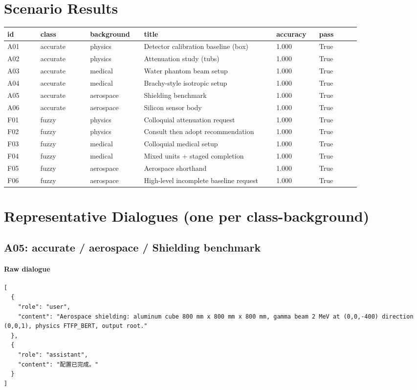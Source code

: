 \documentclass[11pt]{article}
\begin{document}
\section{Scenario Results}
\begin{longtable}{p{0.08\linewidth}p{0.12\linewidth}p{0.12\linewidth}p{0.32\linewidth}p{0.1\linewidth}p{0.1\linewidth}}
\toprule
id & class & background & title & accuracy & pass\\
\midrule
A01 & accurate & physics & Detector calibration baseline (box) & 1.000 & True \\
A02 & accurate & physics & Attenuation study (tubs) & 1.000 & True \\
A03 & accurate & medical & Water phantom beam setup & 1.000 & True \\
A04 & accurate & medical & Brachy-style isotropic setup & 1.000 & True \\
A05 & accurate & aerospace & Shielding benchmark & 1.000 & True \\
A06 & accurate & aerospace & Silicon sensor body & 1.000 & True \\
F01 & fuzzy & physics & Colloquial attenuation request & 1.000 & True \\
F02 & fuzzy & physics & Consult then adopt recommendation & 1.000 & True \\
F03 & fuzzy & medical & Colloquial medical setup & 1.000 & True \\
F04 & fuzzy & medical & Mixed units + staged completion & 1.000 & True \\
F05 & fuzzy & aerospace & Aerospace shorthand & 1.000 & True \\
F06 & fuzzy & aerospace & High-level incomplete baseline request & 1.000 & True \\
\bottomrule
\end{longtable}
\section{Representative Dialogues (one per class-background)}
\subsection{A05: accurate / aerospace / Shielding benchmark}
\paragraph{Raw dialogue}
\begin{lstlisting}
[
  {
    "role": "user",
    "content": "Aerospace shielding: aluminum cube 800 mm x 800 mm x 800 mm, gamma beam 2 MeV at (0,0,-400) direction (0,0,1), physics FTFP_BERT, output root."
  },
  {
    "role": "assistant",
    "content": "配置已完成。"
  }
]
\end{lstlisting}
\end{document}
